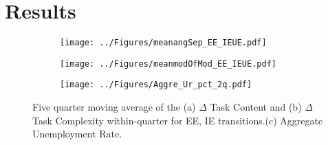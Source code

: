 \documentclass[12pt,authoryear]{elsarticle}
\begin{document}
	
	\section{Results}
	\label{sec:results}
	
	
	

\newpage
\thispagestyle{empty}
	\begin{figure}
		\centering
		\begin{subfigure}[b]{1\textwidth}
			\texttt{[image: ../Figures/meanangSep\_EE\_IEUE.pdf]}
			\caption{}
			\label{fig:Ng1} 
		\end{subfigure}
		
		\begin{subfigure}[b]{1\textwidth}
			\texttt{[image: ../Figures/meanmodOfMod\_EE\_IEUE.pdf]}
			\caption{}
			\label{fig:Ng2}
		\end{subfigure}
				\begin{subfigure}[b]{1\textwidth}
			\texttt{[image: ../Figures/Aggre\_Ur\_pct\_2q.pdf]}
			\caption{}
			\label{fig:Ng3}
		\end{subfigure}
		\caption[Mean $\Delta$ Task Content and $\Delta$ Task Complexity by Transition Type]{Five quarter moving average of the (a) $\Delta$ Task Content and (b) $\Delta$ Task Complexity within-quarter for EE, IE transitions.(c) Aggregate Unemployment Rate.}
	\label{fig:TaskSkillsUR}
	\end{figure}

	\newpage
\clearpage
	
\end{document}
